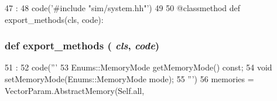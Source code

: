 \begin{DoxyCode}
47                                              :
48         code('#include "sim/system.hh"')
49 
50     @classmethod
    def export_methods(cls, code):
\end{DoxyCode}
\hypertarget{classSystem_1_1System_ab373c5eaef9a7b80491a097389260f4a}{
\subsubsection[{export\_\-methods}]{\setlength{\rightskip}{0pt plus 5cm}def export\_\-methods ( {\em cls}, \/   {\em code})}}
\label{classSystem_1_1System_ab373c5eaef9a7b80491a097389260f4a}



\begin{DoxyCode}
51                                  :
52         code('''
53       Enums::MemoryMode getMemoryMode() const;
54       void setMemoryMode(Enums::MemoryMode mode);
55 ''')
56 
    memories = VectorParam.AbstractMemory(Self.all,
\end{DoxyCode}


